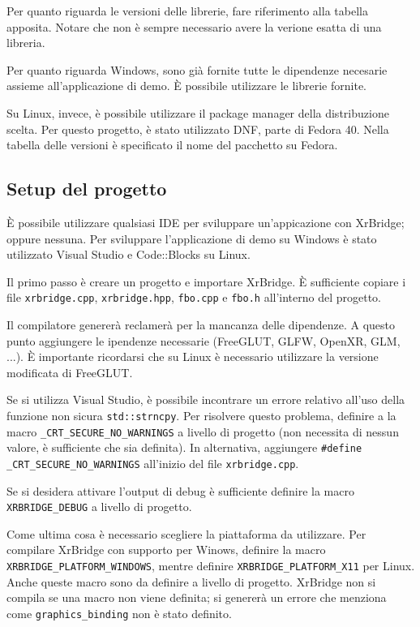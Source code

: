 \documentclass[twoside]{supsistudent}
\begin{document}
Per quanto riguarda le versioni delle librerie, fare riferimento alla tabella apposita. Notare che non è sempre necessario avere la verione esatta di una libreria.

Per quanto riguarda Windows, sono già fornite tutte le dipendenze necesarie assieme all'applicazione di demo. È possibile utilizzare le librerie fornite.

Su Linux, invece, è possibile utilizzare il package manager della distribuzione scelta. Per questo progetto, è stato utilizzato DNF, parte di Fedora 40. Nella tabella delle versioni è specificato il nome del pacchetto su Fedora.

\subsection{Setup del progetto}

È possibile utilizzare qualsiasi IDE per sviluppare un'appicazione con XrBridge; oppure nessuna. Per sviluppare l'applicazione di demo su Windows è stato utilizzato Visual Studio e Code::Blocks su Linux.

Il primo passo è creare un progetto e importare XrBridge. È sufficiente copiare i file \texttt{xrbridge.cpp}, \texttt{xrbridge.hpp}, \texttt{fbo.cpp} e \texttt{fbo.h} all'interno del progetto.

Il compilatore genererà reclamerà per la mancanza delle dipendenze. A questo punto aggiungere le ipendenze necessarie (FreeGLUT, GLFW, OpenXR, GLM, ...). È importante ricordarsi che su Linux è necessario utilizzare la versione modificata di FreeGLUT.

Se si utilizza Visual Studio, è possibile incontrare un errore relativo all'uso della funzione non sicura \texttt{std::strncpy}. Per risolvere questo problema, definire a la macro \texttt{\_CRT\_SECURE\_NO\_WARNINGS} a livello di progetto (non necessita di nessun valore, è sufficiente che sia definita). In alternativa, aggiungere \texttt{\#define \_CRT\_SECURE\_NO\_WARNINGS} all'inizio del file \texttt{xrbridge.cpp}.

Se si desidera attivare l'output di debug è sufficiente definire la macro \texttt{XRBRIDGE\_DEBUG} a livello di progetto.

Come ultima cosa è necessario scegliere la piattaforma da utilizzare. Per compilare XrBridge con supporto per Winows, definire la macro \texttt{XRBRIDGE\_PLATFORM\_WINDOWS}, mentre definire \texttt{XRBRIDGE\_PLATFORM\_X11} per Linux. Anche queste macro sono da definire a livello di progetto. XrBridge non si compila se una macro non viene definita; si genererà un errore che menziona come \texttt{graphics\_binding} non è stato definito.
\end{document}
